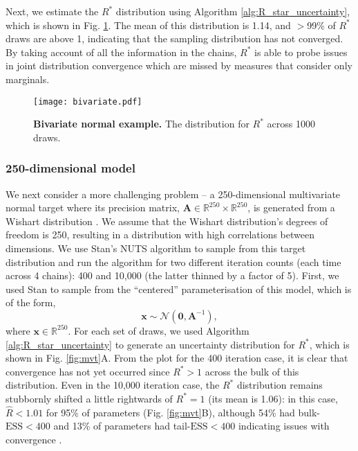 \documentclass{article}
\begin{document}
Next, we estimate the $R^*$ distribution using Algorithm \ref{alg:R_star_uncertainty}, which is shown in Fig. \ref{fig:bivariate}. The mean of this distribution is 1.14, and $>$99\% of $R^*$ draws are above 1, indicating that the sampling distribution has not converged. By taking account of all the information in the chains, $R^*$ is able to probe issues in joint distribution convergence which are missed by measures that consider only marginals.

\begin{figure}[!htb]
	\centerline{\texttt{[image: bivariate.pdf]}}
	\caption{\textbf{Bivariate normal example.} The distribution for $R^*$ across 1000 draws.}
	\label{fig:bivariate}
\end{figure}

\subsubsection{250-dimensional model}\label{sec:multivariate_normal_250}
We next consider a more challenging problem -- a 250-dimensional multivariate normal target where its precision matrix, $\boldsymbol{A}\in\mathbb{R}^{250}\times\mathbb{R}^{250}$, is generated from a Wishart distribution \citep{hoffman2014no}. We assume that the Wishart distribution's degrees of freedom is 250, resulting in a distribution with high correlations between dimensions. We use Stan's NUTS algorithm to sample from this target distribution and run the algorithm for two different iteration counts (each time across 4 chains): 400 and 10,000 (the latter thinned by a factor of 5). First, we used Stan to sample from the ``centered'' parameterisation of this model, which is of the form,
%
\begin{equation}\label{eq:mvt_normal_250}
\boldsymbol{x}\sim \mathcal{N}(\boldsymbol{0},\boldsymbol{A}^{-1}),
\end{equation}
%
where $\boldsymbol{x}\in\mathbb{R}^{250}$. For each set of draws, we used Algorithm \ref{alg:R_star_uncertainty} to generate an uncertainty distribution for $R^*$, which is shown in Fig. \ref{fig:mvt}A. From the plot for the 400 iteration case, it is clear that convergence has not yet occurred since $R^*>1$ across the bulk of this distribution. Even in the 10,000 iteration case, the $R^*$ distribution remains stubbornly shifted a little rightwards of $R^*=1$ (its mean is 1.06): in this case, $\widehat{R}<1.01$ for 95\% of parameters (Fig. \ref{fig:mvt}B), although 54\% had bulk-$\text{ESS}<400$ and 13\% of parameters had tail-$\text{ESS}<400$ indicating issues with convergence \citep{vehtari2019rank}.
\end{document}
